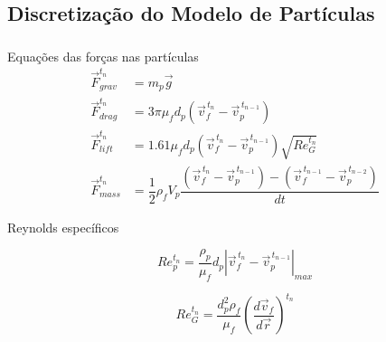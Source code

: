 \documentclass{beamer}
\begin{document}
\subsection*{Discretização do Modelo de Partículas}
\begin{frame}
  \frametitle{\subsecname}
  
  \begin{block}{Equações das forças nas partículas}
      \vspace*{-\baselineskip}\setlength\belowdisplayshortskip{0pt} %
      \begin{align*}
	\vec{F}_{grav}^{t_n} &= m_p \vec{g} \\
	\vec{F}_{drag}^{t_n} &= 3 \pi \mu_f d_p \left(\vec{v}_{f}^{\,t_n} - \vec{v}_{p}^{\,t_{n-1}} \right) \\
	\vec{F}_{lift}^{t_n}\ \ &= 1.61 \mu_f d_p \left(\vec{v}_{f}^{\,t_n} - \vec{v}_{p}^{\,t_{n-1}} \right) \sqrt{{Re}_G^{t_n}} \\
	\vec{F}_{mass}^{t_n} &= \dfrac{1}{2} \rho_f V_p \dfrac{\left(\vec{v}_{f}^{\,t_n} - \vec{v}_{p}^{\,t_{n-1}}\right) -
	\left(\vec{v}_{f}^{\,t_{n-1}} - \vec{v}_{p}^{\,t_{n-2}} \right)}{dt}
      \end{align*}
  \end{block}

  \begin{block}{Reynolds específicos}
    \begin{minipage}{.35\textwidth}
      \vspace*{-\baselineskip}\setlength\belowdisplayshortskip{0pt} %
      \begin{equation*}
	  Re_{p}^{t_n} = \dfrac{\rho_p}{\mu_f} d_{p} \left|\vec{v}_{f}^{\,t_n} - \vec{v}_{p}^{\,t_{n-1}} \right|_{max}
      \end{equation*}
    \end{minipage}
    \hspace{5pt}
    \begin{minipage}{.55\textwidth}
      \begin{equation*}
	  Re_G^{t_n} = \dfrac{d_p^2 \rho_f}{\mu_f} \left( \dfrac{d\vec{v}_f}{d\vec{r}} \right)^{t_n}
      \end{equation*}
    \end{minipage}
  \end{block}
\end{frame}

\end{document}
